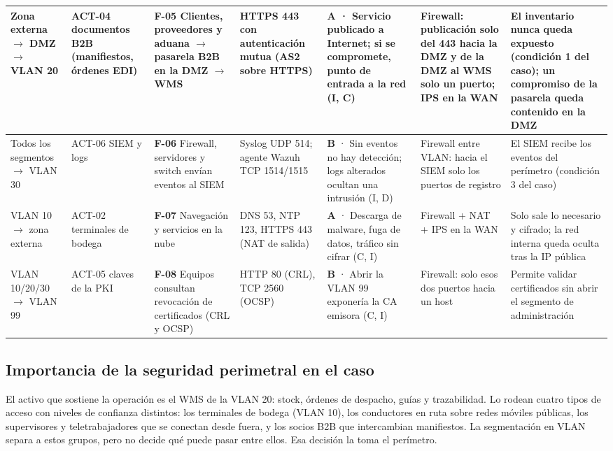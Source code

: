\documentclass[11pt,a4paper]{article}
\newcommand{\ra}{\ensuremath{\rightarrow}}
\begin{document}
\begin{landscape}
{\begin{longtable}{@{}P{2.4cm}P{2.8cm}P{3.4cm}P{2.9cm}P{3.6cm}P{3.6cm}P{4.2cm}@{}}
Zona externa \ra{} DMZ \ra{} VLAN 20 & ACT-04 documentos B2B (manifiestos, órdenes EDI) & \textbf{F-05} Clientes, proveedores y aduana \ra{} pasarela B2B en la DMZ \ra{} WMS & HTTPS 443 con autenticación mutua (AS2 sobre HTTPS) & \textbf{A} · Servicio publicado a Internet; si se compromete, punto de entrada a la red (I, C) & Firewall: publicación solo del 443 hacia la DMZ y de la DMZ al WMS solo un puerto; IPS en la WAN & El inventario nunca queda expuesto (condición 1 del caso); un compromiso de la pasarela queda contenido en la DMZ \\ \midrule
Todos los segmentos \ra{} VLAN 30 & ACT-06 SIEM y logs & \textbf{F-06} Firewall, servidores y switch envían eventos al SIEM & Syslog UDP 514; agente Wazuh TCP 1514/1515 & \textbf{B} · Sin eventos no hay detección; logs alterados ocultan una intrusión (I, D) & Firewall entre VLAN: hacia el SIEM solo los puertos de registro & El SIEM recibe los eventos del perímetro (condición 3 del caso) \\ \midrule
VLAN 10 \ra{} zona externa & ACT-02 terminales de bodega & \textbf{F-07} Navegación y servicios en la nube & DNS 53, NTP 123, HTTPS 443 (NAT de salida) & \textbf{A} · Descarga de malware, fuga de datos, tráfico sin cifrar (C, I) & Firewall + NAT + IPS en la WAN & Solo sale lo necesario y cifrado; la red interna queda oculta tras la IP pública \\ \midrule
VLAN 10/20/30 \ra{} VLAN 99 & ACT-05 claves de la PKI & \textbf{F-08} Equipos consultan revocación de certificados (CRL y OCSP) & HTTP 80 (CRL), TCP 2560 (OCSP) & \textbf{B} · Abrir la VLAN 99 exponería la CA emisora (C, I) & Firewall: solo esos dos puertos hacia un host & Permite validar certificados sin abrir el segmento de administración \\ \bottomrule
\end{longtable}
}
\end{landscape}

\subsection{Importancia de la seguridad perimetral en el caso}

El activo que sostiene la operación es el WMS de la VLAN 20: stock, órdenes de despacho, guías y trazabilidad. Lo rodean cuatro tipos de acceso con niveles de confianza distintos: los terminales de bodega (VLAN 10), los conductores en ruta sobre redes móviles públicas, los supervisores y teletrabajadores que se conectan desde fuera, y los socios B2B que intercambian manifiestos. La segmentación en VLAN separa a estos grupos, pero no decide qué puede pasar entre ellos. Esa decisión la toma el perímetro.
\end{document}
